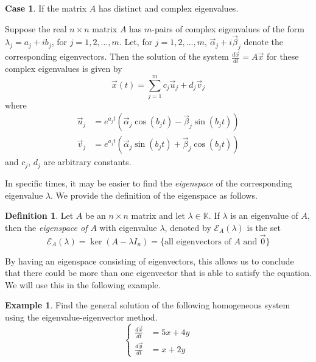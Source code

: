 \documentclass[11pt]{book}
\theoremstyle{definition}\newtheorem{definition}[subsection]{Definition}
\theoremstyle{definition}\newtheorem{example}[subsection]{Example}
\theoremstyle{definition}\newtheorem{notation}[subsection]{Notation}
\theoremstyle{definition}\newtheorem{remark}[subsection]{Remark}
\theoremstyle{theorem}\newtheorem{theorem}[subsection]{Theorem}
\theoremstyle{theorem}\newtheorem{lemma}[subsection]{Lemma}
\theoremstyle{theorem}\newtheorem{proposition}[subsection]{Proposition}
\theoremstyle{theorem}\newtheorem{corollary}[subsection]{Corollary}
\theoremstyle{theorem}\newtheorem{case}{Case}
\theoremstyle{remark}\newtheorem{subcase}{Subcase}[case]
\newcommand{\K}{\mathbb{K}}
\newcommand{\E}{\mathcal{E}}
\begin{document}
\begin{case}
    If the matrix $A$ has distinct and complex eigenvalues.
\end{case}

Suppose the real $n \times n$ matrix $A$ has $m$-pairs of complex eigenvalues of the form $\lambda_j = a_j + ib_j$, for $j = 1, 2,..., m$. Let, for $j = 1, 2,..., m$, $\vec{\alpha}_j + i\vec{\beta}_j$ denote the corresponding eigenvectors. Then the solution of the system $\frac{d\vec{x}}{dt} = A\vec{x}$ for these complex eigenvalues is given by
\begin{equation*}
    \vec{x}(t) = \sum_{j = 1}^{m} c_j\vec{u}_j + d_j\vec{v}_j
\end{equation*}
where 
\begin{align*}
    \vec{u}_j &= e^{a_j t}\left(\vec{\alpha}_j\cos(b_jt) - \vec{\beta}_j\sin(b_jt)\right) \\
    \vec{v}_j &= e^{a_j t}\left(\vec{\alpha}_j\sin(b_jt) + \vec{\beta}_j\cos(b_jt)\right)
\end{align*}
and $c_j$, $d_j$ are arbitrary constants. 

In specific times, it may be easier to find the \emph{eigenspace} of the corresponding eigenvalue $\lambda$. We provide the definition of the eigenspace as follows.

\begin{definition}\label{definition:1.2.2} 
    Let $A$ be an $n \times n$ matrix and let $\lambda \in \K$. If $\lambda$ is an eigenvalue of $A$, then the \emph{eigenspace of $A$} with eigenvalue $\lambda$, denoted by $\E_A(\lambda)$ is the set
    \begin{equation*}
        \E_A(\lambda) = \ker(A - \lambda I_n) = \{\text{all eigenvectors of $A$ and $\vec{0}$}\}
    \end{equation*}
\end{definition}

By having an eigenspace consisting of eigenvectors, this allows us to conclude that there could be more than one eigenvector that is able to satisfy the equation. We will use this in the following example.

\begin{example}\label{example:1.2.3}
    Find the general solution of the following homogeneous system using the eigenvalue-eigenvector method.
    \begin{equation*}
        \begin{cases}
            \frac{d\vec{x}}{dt} &= 5x + 4y \\
            \frac{d\vec{y}}{dt} &= x + 2y
        \end{cases}
    \end{equation*}
\end{example}
\end{document}
